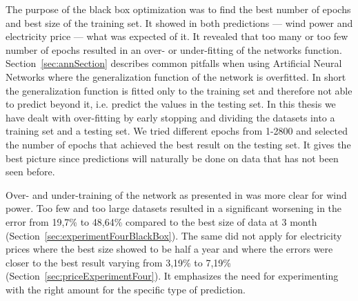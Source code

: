 The purpose of the black box optimization was to find the best number of epochs and best size of the training set. It showed in both predictions --- wind power and electricity price --- what was expected of it. It revealed that too many or too few number of epochs resulted in an over- or under-fitting of the networks function. Section~\ref{sec:annSection} describes common pitfalls when using Artificial Neural Networks where the generalization function of the network is overfitted. In short the generalization function is fitted only to the training set and therefore not able to predict beyond it, i.e. predict the values in the testing set. In this thesis we have dealt with over-fitting by early stopping and dividing the datasets into a training set and a testing set. We tried different epochs from 1-2800 and selected the number of epochs that achieved the best result on the testing set. It gives the best picture since predictions will naturally be done on data that has not been seen before. 

Over- and under-training of the network as presented in\cite{1} was more clear for wind power. Too few  and too large datasets resulted in a significant worsening in the error from 19,7\% to 48,64\% compared to the best size of data at 3 month (Section~\ref{sec:experimentFourBlackBox}). The same did not apply for electricity prices where the best size showed to be half a year and where the errors were closer to the best result varying from 3,19\% to 7,19\% (Section~\ref{sec:priceExperimentFour}). It emphasizes the need for experimenting with the right amount for the specific type of prediction.

